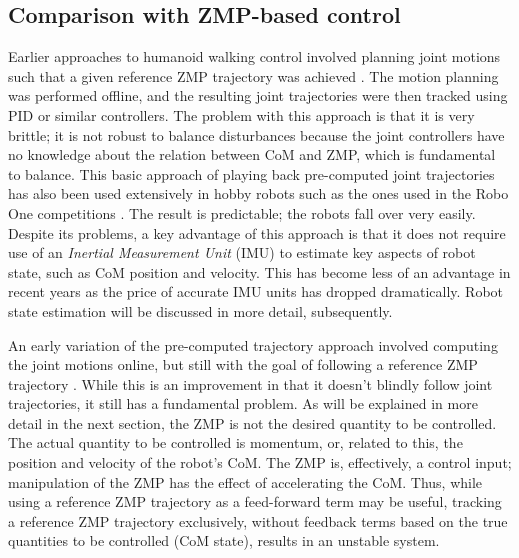 \documentclass{llncs}
\begin{document}
\subsection{Comparison with ZMP-based control}

Earlier approaches to humanoid walking control involved planning joint motions such that a 
given reference ZMP trajectory was achieved \cite{nishiwaki2001online}.
The motion planning was performed offline, and the resulting joint trajectories were then tracked 
using PID or similar controllers.
The problem with this approach is that it is very brittle;  it is not robust to balance disturbances
because the joint controllers have no knowledge about the relation between CoM and ZMP, which is 
fundamental to balance.
This basic approach of playing back pre-computed joint trajectories has also been used extensively
in hobby robots such as the ones used in the Robo One competitions \cite{roboone}.  
The result is predictable;  the robots fall over very easily.
Despite its problems, a key advantage of this approach is that it does not require use of an
\textit{Inertial Measurement Unit} (IMU) to estimate key aspects of robot state, such as CoM position
and velocity.  
This has become less of an advantage in recent years as the price of accurate 
IMU units has dropped dramatically.
Robot state estimation will be discussed in more detail, subsequently.

An early variation of the pre-computed trajectory approach involved computing the joint motions 
online, but still with the goal of following a reference ZMP trajectory \cite{nishiwaki2002online, 
kagami2002fast, sugihar2002real}.  
While this is an improvement in that it doesn't blindly follow
joint trajectories, it still has a fundamental problem.
As will be explained in more detail in the next section, the ZMP is not the desired quantity to be
controlled. 
The actual quantity to be controlled is momentum, or, related to this, the position and velocity of the 
robot's CoM.
The ZMP is, effectively, a control input;  manipulation of the ZMP has the effect of accelerating the CoM.
Thus, while using a reference ZMP trajectory as a feed-forward term may be useful,
tracking a reference ZMP trajectory exclusively, without feedback terms based on the true
quantities to be controlled (CoM state), results in an unstable system.
\end{document}
